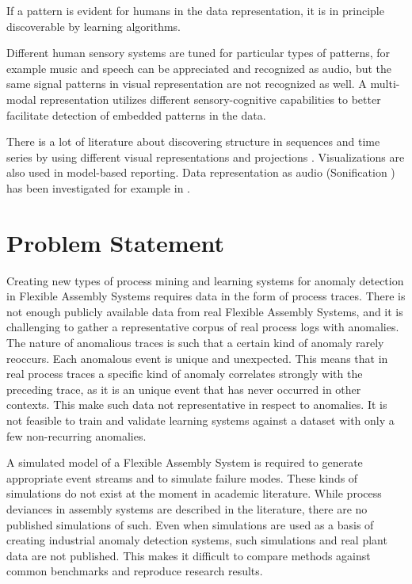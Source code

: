\documentclass[a4paper,10pt]{article}
\begin{document}
If a pattern is evident for humans in the data representation, it is in principle discoverable by learning algorithms.

Different human sensory systems are tuned for particular types of patterns, for example music and speech
can be appreciated and recognized as audio, but the same signal patterns in visual representation are not recognized as well.
A multi-modal representation utilizes different sensory-cognitive capabilities to better facilitate detection of embedded patterns in the data.

There is a lot of literature about discovering structure in sequences and time series by using different visual representations and
projections \cite{hein2010recognition,misue2014chronoview}. Visualizations are also used in model-based reporting\cite{schuh2013ieee}.
Data representation as audio (Sonification \cite{refKra}) has been investigated for example in \cite{yeung1980pattern,kaper1999data}.

\section{Problem Statement}

Creating new types of process mining and learning systems for anomaly detection in Flexible Assembly Systems requires data in the form of process traces.
There is not enough publicly available data from real Flexible Assembly Systems, and it is challenging to gather a representative corpus of real process logs with anomalies.
The nature of anomalious traces is such that a certain kind of anomaly rarely reoccurs. Each anomalous event is unique and unexpected. This means
that in real process traces a specific kind of anomaly correlates strongly with the preceding trace, as it is an unique event that has never occurred in other contexts.
This make such data not representative in respect to anomalies. It is not feasible to train and validate learning systems against a dataset with only a few non-recurring anomalies.

A simulated model of a Flexible Assembly System is required to generate appropriate event streams and to simulate failure modes. These kinds of simulations
do not exist at the moment in academic literature. While process deviances in assembly systems are described in the literature, there are no published simulations of such.
Even when simulations are used as a basis of creating industrial anomaly detection systems, such simulations and real plant data are not published\cite{matarese2013procedure}.
This makes it difficult to compare methods against common benchmarks and reproduce research results.
\end{document}
